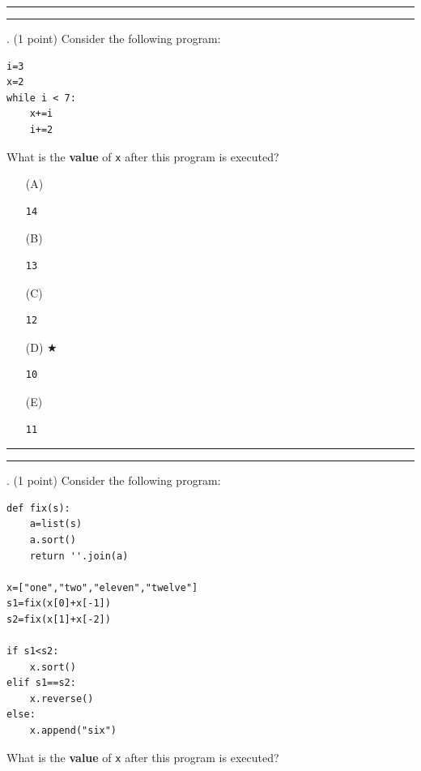 \documentclass{article}
\begin{document}
\vspace*{2em}
\hrule
\vspace{2em}

\vspace{2em}
\hrule height 2pt


\newpage
{}. (1 point)
Consider the following program:
\begin{verbatim}
i=3
x=2
while i < 7:
    x+=i
    i+=2
\end{verbatim}
What is the \textbf{value} of \texttt{x} after this program is executed?


\begin{enumerate}
\item[(A)]
\begin{verbatim}14\end{verbatim}

\item[(B)]
\begin{verbatim}13\end{verbatim}

\item[(C)]
\begin{verbatim}12\end{verbatim}

\item[(D)] $\bigstar$ 
\begin{verbatim}10\end{verbatim}

\item[(E)]
\begin{verbatim}11\end{verbatim}

\end{enumerate}

\vspace*{2em}
\hrule
\vspace{2em}

\vspace{2em}
\hrule height 2pt


\newpage
{}. (1 point)
Consider the following program:
\begin{verbatim}
def fix(s):
    a=list(s)
    a.sort()
    return ''.join(a)

x=["one","two","eleven","twelve"]
s1=fix(x[0]+x[-1])
s2=fix(x[1]+x[-2])

if s1<s2:
    x.sort()
elif s1==s2:
    x.reverse()
else:
    x.append("six")
\end{verbatim}
What is the \textbf{value} of \texttt{x} after this program is executed?
\end{document}
